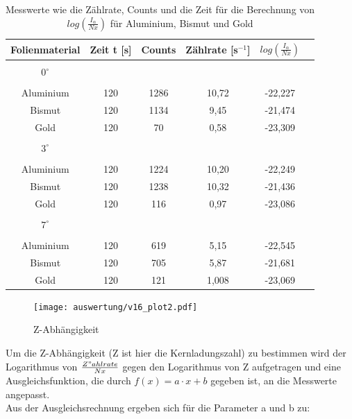 \begin{table}[H]
\centering
\begin{tabular}{c|c c c c c}

	Folienmaterial & Zeit t [s]& Counts & Zählrate [s$^{-1}$] & $log(\frac{I_\alpha}{Nx})$ \\
	\hline \\
	$0^\circ$ \\
	\hline \\
	Aluminium & 120  & 1286 & 10,72 & -22,227 \\

	Bismut & 120 & 1134 & 9,45 & -21,474 \\

	Gold & 120 & 70 & 0,58 & -23,309\\
	\hline \\
	$3^\circ$ \\
	\hline \\	
	Aluminium & 120  & 1224 & 10,20 & -22,249 \\

	Bismut & 120 & 1238 & 10,32 & -21,436\\

	Gold & 120 & 116 & 0,97 & -23,086\\
	\hline \\
	$7^\circ$ \\
	\hline \\
	 Aluminium & 120  & 619 & 5,15 & -22,545 \\

	Bismut & 120 & 705 & 5,87 & -21,681\\

	Gold & 120 & 121 & 1,008 & -23,069\\

\end{tabular}
	\caption{Messwerte wie die Zählrate, Counts und die Zeit für die Berechnung von $log(\frac{I_\alpha}{Nx})$ für Aluminium, Bismut und Gold}
	\label{tab:werte}
\end{table}


\begin{figure}[H]
	\centering
	\texttt{[image: auswertung/v16\_plot2.pdf]}
	\caption{Z-Abhängigkeit}
	\label{img:grafik-dummy}
\end{figure}

Um die Z-Abhängigkeit (Z ist hier die Kernladungszahl) zu bestimmen wird der Logarithmus von $\frac{Z"ahlrate}{Nx}$ gegen den Logarithmus von Z aufgetragen und eine Ausgleichsfunktion, die durch $f(x)=a\cdot x+b$ gegeben ist, an die Messwerte angepasst. \\
Aus der Ausgleichsrechnung ergeben sich für die Parameter a und b zu:

